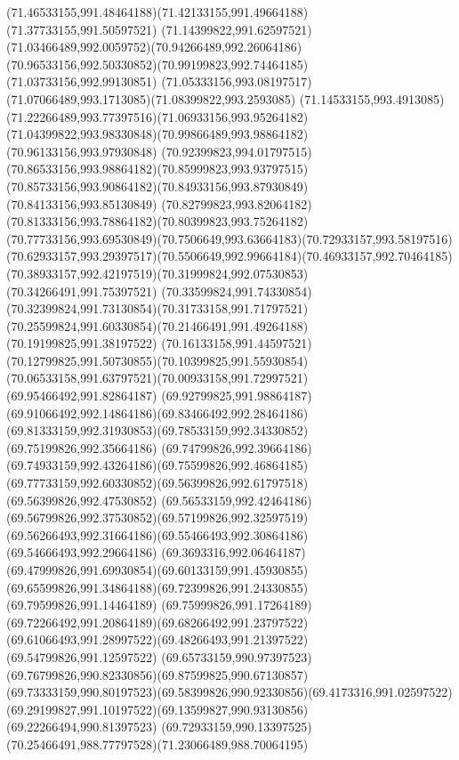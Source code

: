 {{\curveto(71.46533155,991.48464188)(71.42133155,991.49664188)(71.37733155,991.50597521)
\curveto(71.14399822,991.62597521)(71.03466489,992.0059752)(70.94266489,992.26064186)
\curveto(70.96533156,992.50330852)(70.99199823,992.74464185)(71.03733156,992.99130851)
\curveto(71.05333156,993.08197517)(71.07066489,993.1713085)(71.08399822,993.2593085)
\curveto(71.14533155,993.4913085)(71.22266489,993.77397516)(71.06933156,993.95264182)
\curveto(71.04399822,993.98330848)(70.99866489,993.98864182)(70.96133156,993.97930848)
\curveto(70.92399823,994.01797515)(70.86533156,993.98864182)(70.85999823,993.93797515)
\curveto(70.85733156,993.90864182)(70.84933156,993.87930849)(70.84133156,993.85130849)
\curveto(70.82799823,993.82064182)(70.81333156,993.78864182)(70.80399823,993.75264182)
\curveto(70.77733156,993.69530849)(70.7506649,993.63664183)(70.72933157,993.58197516)
\curveto(70.62933157,993.29397517)(70.5506649,992.99664184)(70.46933157,992.70464185)
\curveto(70.38933157,992.42197519)(70.31999824,992.07530853)(70.34266491,991.75397521)
\curveto(70.33599824,991.74330854)(70.32399824,991.73130854)(70.31733158,991.71797521)
\curveto(70.25599824,991.60330854)(70.21466491,991.49264188)(70.19199825,991.38197522)
\curveto(70.16133158,991.44597521)(70.12799825,991.50730855)(70.10399825,991.55930854)
\curveto(70.06533158,991.63797521)(70.00933158,991.72997521)(69.95466492,991.82864187)
\curveto(69.92799825,991.98864187)(69.91066492,992.14864186)(69.83466492,992.28464186)
\curveto(69.81333159,992.31930853)(69.78533159,992.34330852)(69.75199826,992.35664186)
\curveto(69.74799826,992.39664186)(69.74933159,992.43264186)(69.75599826,992.46864185)
\curveto(69.77733159,992.60330852)(69.56399826,992.61797518)(69.56399826,992.47530852)
\curveto(69.56533159,992.42464186)(69.56799826,992.37530852)(69.57199826,992.32597519)
\curveto(69.56266493,992.31664186)(69.55466493,992.30864186)(69.54666493,992.29664186)
\curveto(69.3693316,992.06464187)(69.47999826,991.69930854)(69.60133159,991.45930855)
\curveto(69.65599826,991.34864188)(69.72399826,991.24330855)(69.79599826,991.14464189)
\curveto(69.75999826,991.17264189)(69.72266492,991.20864189)(69.68266492,991.23797522)
\curveto(69.61066493,991.28997522)(69.48266493,991.21397522)(69.54799826,991.12597522)
\curveto(69.65733159,990.97397523)(69.76799826,990.82330856)(69.87599825,990.67130857)
\curveto(69.73333159,990.80197523)(69.58399826,990.92330856)(69.4173316,991.02597522)
\curveto(69.29199827,991.10197522)(69.13599827,990.93130856)(69.22266494,990.81397523)
\curveto(69.72933159,990.13397525)(70.25466491,988.77797528)(71.23066489,988.70064195)
}}
